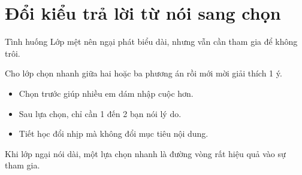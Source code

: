 \section{Đổi kiểu trả lời từ nói sang chọn}
\begin{tinhhuong}{Tình huống}
Lớp mệt nên ngại phát biểu dài, nhưng vẫn cần tham gia để không trôi.
\end{tinhhuong}
\begin{goiydungngay}
Cho lớp chọn nhanh giữa hai hoặc ba phương án rồi mới mời giải thích 1 ý.
\begin{itemize}
\item Chọn trước giúp nhiều em dám nhập cuộc hơn.
\item Sau lựa chọn, chỉ cần 1 đến 2 bạn nói lý do.
\item Tiết học đổi nhịp mà không đổi mục tiêu nội dung.
\end{itemize}
\end{goiydungngay}
\begin{cauchot}
Khi lớp ngại nói dài, một lựa chọn nhanh là đường vòng rất hiệu quả vào sự tham gia.
\end{cauchot}
